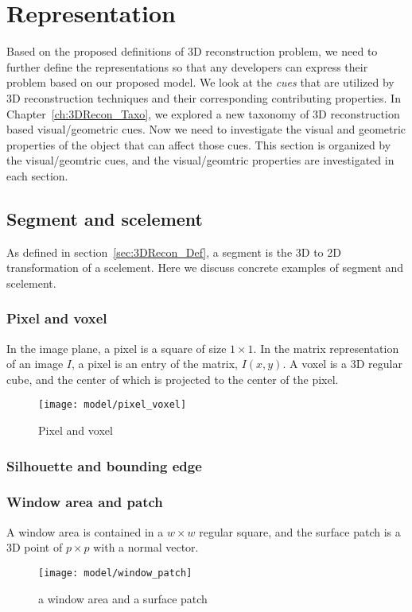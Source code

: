 \section{Representation}
\label{sec:3DRecon_Rep}
Based on the proposed definitions of 3D reconstruction problem, we need to further define the representations so that any developers can express their problem based on our proposed model. We look at the \textit{cues} that are utilized by 3D reconstruction techniques and their corresponding contributing properties. In Chapter~\ref{ch:3DRecon_Taxo}, we explored a new taxonomy of 3D reconstruction based visual/geometric cues. Now we need to investigate the visual and geometric properties of the object that can affect those cues. This section is organized by the visual/geomtric cues, and the visual/geomtric properties are investigated in each section.

\subsection{Segment and scelement}
As defined in section~\ref{sec:3DRecon_Def}, a segment is the 3D to 2D transformation of a scelement. Here we discuss concrete examples of segment and scelement.

\subsubsection{Pixel and voxel}
In the image plane, a pixel is a square of size $1\times 1$. In the matrix representation of an image $I$, a pixel is an entry of the matrix, $I(x, y)$. A voxel is a 3D regular cube, and the center of which is projected to the center of the pixel.
\begin{figure}[h]
\centering
\texttt{[image: model/pixel\_voxel]}
\caption{Pixel and voxel}
\end{figure}

\subsubsection{Silhouette and bounding edge}


\subsubsection{Window area and patch}
A window area is contained in a $w\times w$ regular square, and the surface patch is a 3D point of $p\times p$ with a normal vector.
\begin{figure}[h]
\centering
\texttt{[image: model/window\_patch]}
\caption{a window area and a surface patch}
\end{figure}

